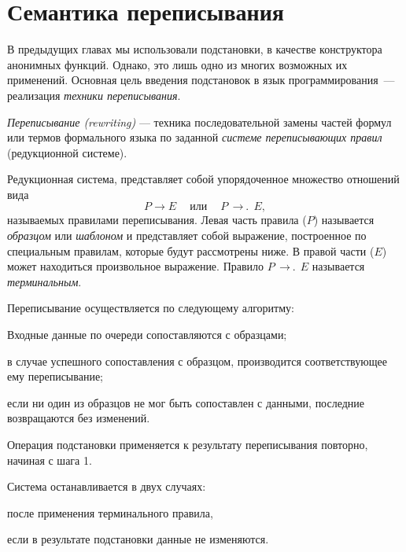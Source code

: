 \label{Less:rewriting}

\newcommand{\term}{\ensuremath{\mathop{\,\rightarrow\!\!.\,}}}

\section{Семантика  переписывания}%
В предыдущих главах мы использовали подстановки, в качестве конструктора анонимных функций. Однако, это лишь одно из многих возможных их применений. Основная цель введения подстановок в язык программирования~--- реализация \emph{техники переписывания}.

\emph{Переписывание (rewriting)} --- техника последовательной замены частей формул или термов формального языка по заданной \emph{системе переписывающих правил} (редукционной системе).

Редукционная система, представляет собой упорядоченное множество отношений вида $$P\to E~\quad\text{или}\quad~P\term E,$$ называемых правилами переписывания. Левая часть правила ($P$) называется \emph{образцом} или \emph{шаблоном} и представляет собой выражение, построенное по специальным правилам, которые будут рассмотрены ниже. В правой части ($E$) может находиться произвольное выражение. Правило $P \term E$ называется \emph{терминальным}.

Переписывание осуществляется по следующему алгоритму:

\begin{Algorythm}\label{rewriting-semantics}
  \item Входные данные по очереди сопоставляются с образцами;
  \begin{Algorythm}
    \item в случае успешного сопоставления с образцом, производится соответствующее ему переписывание;
    \item если ни один из образцов не мог быть сопоставлен с данными, последние возвращаются без изменений.
  \end{Algorythm}
  \item Операция подстановки применяется к результату переписывания повторно, начиная с шага 1.
  \item Система останавливается в двух случаях:
  \begin{Algorythm} 
    \item после применения терминального правила,
    \item если в результате подстановки данные не изменяются.
  \end{Algorythm}
\end{Algorythm}

